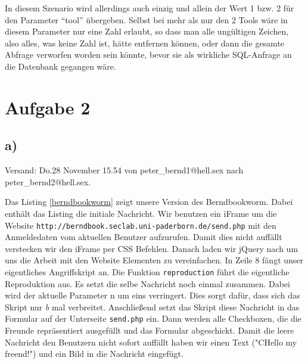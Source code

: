 \documentclass[10pt,a4paper]{article}
\begin{document}
In diesem Szenario wird allerdings auch einzig und allein der Wert 1 bzw. 2 für den Parameter "`tool"' übergeben. Selbst bei mehr als nur den 2 Tools wäre in diesem Parameter nur eine Zahl erlaubt, so dass man alle ungültigen Zeichen, also alles, was keine Zahl ist, hätte entfernen können, oder dann die gesamte Abfrage verworfen worden sein könnte, bevor sie als wirkliche SQL-Anfrage an die Datenbank gegangen wäre.

\section*{Aufgabe 2}

\subsection*{a)}

Versand: Do.28 November 15.54 von peter\_bernd1@hell.sex nach peter\_bernd2@hell.sex.


Das Listing \ref{berndbookworm} zeigt unsere Version des Berndbookworm. Dabei enthält das Listing die initiale Nachricht. Wir benutzen ein iFrame um die Website \texttt{http://berndbook.seclab.uni-paderborn.de/send.php} mit den Anmeldedaten vom aktuellen Benutzer aufzurufen. Damit dies nicht auffällt verstecken wir den iFrame per CSS Befehlen. Danach laden wir jQuery nach um uns die Arbeit mit den Website Elementen zu vereinfachen. In Zeile 8 fängt unser eigentliches Angriffskript an. Die Funktion \texttt{reproduction} führt die eigentliche Reproduktion aus. Es setzt die selbe Nachricht noch einmal zusammen. Dabei wird der aktuelle Parameter n um eins verringert. Dies sorgt dafür, dass sich das Skript nur \textit{b} mal verbreitet. Anschließend setzt das Skript diese Nachricht in das Formular auf der Unterseite \texttt{send.php} ein. Dann werden alle Checkboxen, die die Freunde repräsentiert ausgefüllt und das Formular abgeschickt. Damit die leere Nachricht den Benutzern nicht sofort auffällt haben wir einen Text ("CHello my freend!") und ein Bild in die Nachricht eingefügt.
\end{document}
